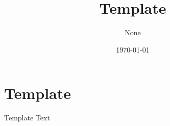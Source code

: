 \documentclass[a4paper,11pt]{article}
\title{Template}
\author{None}
\date{\today}
\begin{document}
\maketitle



\section{Template}
Template Text


\newpage
\printbibliography
\newpage
\end{document}
